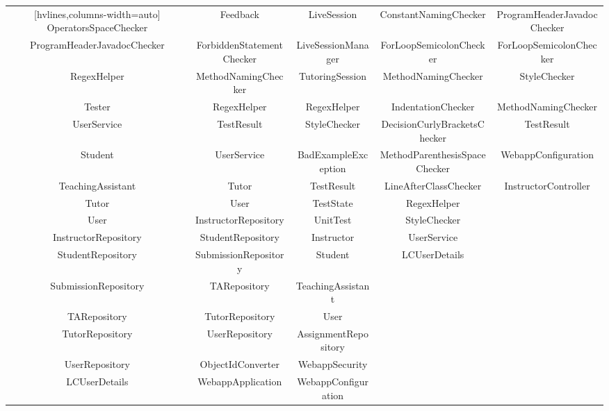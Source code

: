 \documentclass[a4paper, 12pt]{article}
\begin{document}
\begin{table}[ht]
{\begin{NiceTabular}{ccccc}[hvlines,columns-width=auto]
            OperatorsSpaceChecker & Feedback & LiveSession & ConstantNamingChecker & ProgramHeaderJavadocChecker \\

            ProgramHeaderJavadocChecker & ForbiddenStatementChecker & LiveSessionManager & ForLoopSemicolonChecker & ForLoopSemicolonChecker \\

            RegexHelper & MethodNamingChecker & TutoringSession & MethodNamingChecker & StyleChecker \\

            Tester & RegexHelper & RegexHelper & IndentationChecker & MethodNamingChecker \\

            UserService & TestResult & StyleChecker & DecisionCurlyBracketsChecker & TestResult \\

            Student & UserService & BadExampleException & MethodParenthesisSpaceChecker & WebappConfiguration \\

            TeachingAssistant & Tutor & TestResult & LineAfterClassChecker & InstructorController \\

            Tutor & User & TestState & RegexHelper &  \\

            User & InstructorRepository & UnitTest & StyleChecker &  \\

            InstructorRepository & StudentRepository & Instructor & UserService &  \\

            StudentRepository & SubmissionRepository & Student & LCUserDetails &  \\

            SubmissionRepository & TARepository & TeachingAssistant &  &  \\

            TARepository & TutorRepository & User &  &  \\

            TutorRepository & UserRepository & AssignmentRepository &  &  \\

            UserRepository & ObjectIdConverter & WebappSecurity &  &  \\

            LCUserDetails & WebappApplication & WebappConfiguration &  &  \\


\end{NiceTabular}}
\end{table}
\end{document}
